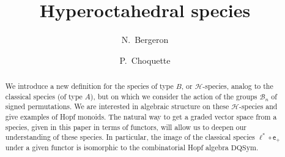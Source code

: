 \documentclass[11pt,reqno]{amsart}
\title[Hyperoctahedral species]{Hyperoctahedral species}
\author[N.~Bergeron]{N.~Bergeron}
\author[P.~Choquette]{P.~Choquette}
\numberwithin{equation}{section}
\def\H{{\mathcal{H}}}
\def\exp{{\textsf{e}}}
\def\Bn{\mathcal{B}_n}
\def\DQSym{\mathrm{DQSym}}
\begin{document}
\begin{abstract}
We introduce a new definition for the species of type $B$, or $\H$-species, analog to the classical species (of type $A$), but on which we consider the action of the groups $\Bn$ of signed permutations. We are interested in algebraic structure on these $\H$-species and give examples of Hopf monoids. The natural way to get a graded vector space from a species, given in this paper in terms of functors, will allow us to deepen our understanding of these species. In particular, the image of the classical species $\ell^{\ast}\circ \exp_+$ under a given functor is isomorphic to the combinatorial Hopf algebra $\DQSym$.
\end{abstract}

\maketitle

\parskip=8pt  
\end{document}
